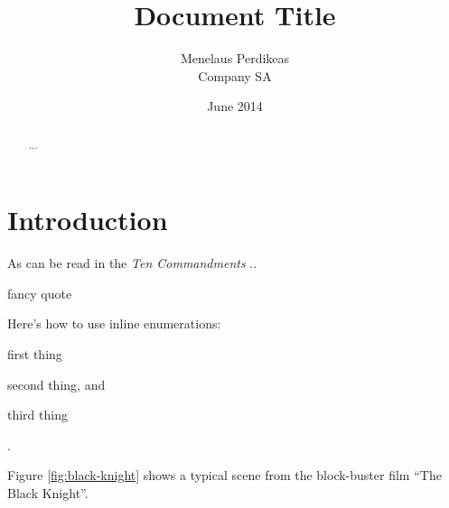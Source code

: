 \documentclass[11pt,twoside,a4paper,pagesize]{report}
\begin{document}
\title{\color{blue}Document Title}
\author{Menelaus Perdikeas\\ Company SA}
\date{June 2014}
\maketitle

\tableofcontents
\listoffigures
\lstlistoflistings

\renewcommand{\abstractname}{Executive Summary}
\begin{abstract}
...
\end{abstract}

\chapter{Introduction}
As can be read in the \textit{Ten Commandments} \cite{ref:ten-commandments} ..

\begin{quoting}
fancy quote
\end{quoting}

Here's how to use inline enumerations:
\begin{inparaenum}[i)]
\item first thing
\item second thing, and
\item third thing
\end{inparaenum}.

Figure \ref{fig:black-knight} shows a typical scene from the block-buster
film ``The Black Knight''.


\begin{comment}
    another way to write comments
\end{comment}

\begin{comment}
\begin{figure}[htbp]
    \centering
    \texttt{[image: BlackKnight.png]}
    \caption{The Black Knight}
    \label{fig:black-knight}
\end{figure}
\end{comment}


\restoregeometry
\end{document}
